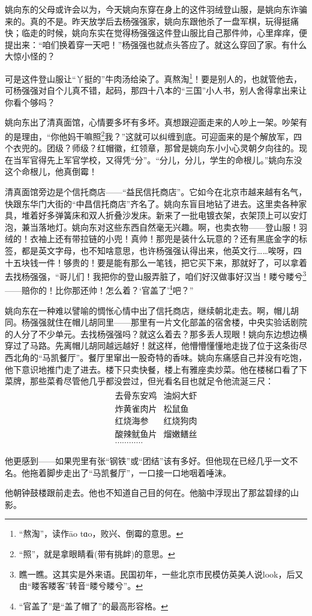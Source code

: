 \par 姚向东的父母或许会以为，今天姚向东穿在身上的这件羽绒登山服，是姚向东诈骗来的。真的不是。昨天放学后去杨强强家，姚向东跟他杀了一盘军棋，玩得挺痛快；临走的时候，姚向东实在觉得杨强强这件登山服比自己那件帅，心里痒痒，便提出来：“咱们换着穿一天吧！”杨强强也就点头答应了。就这么穿回了家。有什么大惊小怪的？
\par 可是这件登山服让“丫挺的”牛肉汤给染了。真熬淘\footnote{“熬淘”，读作āo tɑo，败兴、倒霉的意思。}！要是别人的，也就管他去，可杨强强对自个儿真不错，起码，那四十八本的“三国”小人书，别人舍得拿出来让你看个够吗？
\par 姚向东出了清真面馆，心情要多坏有多坏。真想跟迎面走来的人吵上一架。吵架有的是理由，“你他妈干嘛照\footnote{“照”，就是拿眼睛看(带有挑衅)的意思。}我？”这就可以纠缠到底。可迎面来的是个解放军，四个衣兜的。团级？师级？红帽徽，红领章，那曾是姚向东小小心灵朝夕向往的。现在当军官得先上军官学校，又得凭“分”。“分儿，分儿，学生的命根儿。”姚向东没这个命根儿，他真倒霉！
\par 清真面馆旁边是个信托商店——“益民信托商店”。它如今在北京市越来越有名气，快跟东华门大街的“中昌信托商店”齐名了。姚向东盲目地钻了进去。这里卖各种家具，堆着好多弹簧床和双人折叠沙发床。新来了一批电镀衣架，衣架顶上可以安灯泡，兼当落地灯。姚向东对这些东西自然毫无兴趣。啊，也卖衣物——登山服！羽绒的！衣袖上还有带拉链的小兜！真帅！那兜是装什么玩意的？还有黑底金字的标签，都是英文字母，也不知啥意思，也许杨强强认得出来，他英文行……唉呀，四十五块钱一件！够贵的！要是能有那么一笔钱，把它买下来，那就好了，可以拿着去找杨强强，“哥儿们！我把你的登山服弄脏了，咱们好汉做事好汉当！䁖兮䁖兮\footnote{瞧一瞧。这其实是外来语。民国初年，一些北京市民模仿英美人说look，后又由“䁖客䁖客”转音“䁖兮䁖兮”。}——赔你的！比你那还帅！怎么着？‘官盖了’\footnote{“官盖了”是“盖了帽了”的最高形容格。}吧？”
\par 姚向东在一种难以譬喻的惆怅心情中出了信托商店，继续朝北走去。啊，帽儿胡同。杨强强就住在帽儿胡同里——那里有一片文化部盖的宿舍楼，中央实验话剧院的人分了不少单元。去找杨强强吗？就这么着去？那多丢人现眼！姚向东边想边横穿过了马路。先离帽儿胡同越远越好！就这样，他懵懵懂懂地走拢了位于这条街尽西北角的“马凯餐厅”。餐厅里窜出一股奇特的香味。姚向东痛感自己并没有吃饱，他下意识地推门走了进去。楼下只卖快餐，楼上有雅座卖炒菜。他在楼梯口看了下菜牌，那些菜肴尽管他几乎都没尝过，但光看名目也就足令他流涎三尺：
\begin{gather*}
    \begin{matrix}
        \text{去骨东安鸡} &  \text{油焖大虾} \\
        \text{炸黄雀肉片} &  \text{松鼠鱼} \\
        \text{红烧海参}   &  \text{红烧狗肉} \\
        \text{酸辣鱿鱼片} &  \text{熘嫩鳝丝} \\
        \text{…………}&
    \end{matrix}
\end{gather*}
\par 他更感到——如果兜里有张“钢铁”或“团结”该有多好。但他现在已经几乎一文不名。他拖着脚步走出了“马凯餐厅”，一口接一口地咽着唾沫。
\par 他朝钟鼓楼跟前走去。他也不知道自己目的何在。他脑中浮现出了那盆碧绿的山影。


